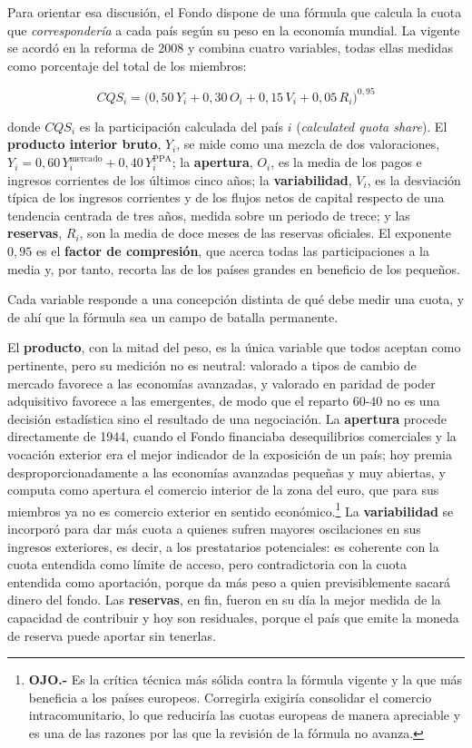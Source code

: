 \documentclass[10pt,a4paper]{article}
\begin{document}
Para orientar esa discusión, el Fondo dispone de una fórmula que calcula la cuota que \textit{correspondería} a cada país según su peso en la economía mundial. La vigente se acordó en la reforma de 2008 y combina cuatro variables, todas ellas medidas como porcentaje del total de los miembros:

$$CQS_i=\bigl(0{,}50\,Y_i+0{,}30\,O_i+0{,}15\,V_i+0{,}05\,R_i\bigr)^{0{,}95}$$

donde $CQS_i$ es la participación calculada del país $i$ (\textit{calculated quota share}). El \textbf{producto interior bruto}, $Y_i$, se mide como una mezcla de dos valoraciones, $Y_i=0{,}60\,Y_i^{\text{mercado}}+0{,}40\,Y_i^{\text{PPA}}$; la \textbf{apertura}, $O_i$, es la media de los pagos e ingresos corrientes de los últimos cinco años; la \textbf{variabilidad}, $V_i$, es la desviación típica de los ingresos corrientes y de los flujos netos de capital respecto de una tendencia centrada de tres años, medida sobre un periodo de trece; y las \textbf{reservas}, $R_i$, son la media de doce meses de las reservas oficiales. El exponente $0{,}95$ es el \textbf{factor de compresión}, que acerca todas las participaciones a la media y, por tanto, recorta las de los países grandes en beneficio de los pequeños.

Cada variable responde a una concepción distinta de qué debe medir una cuota, y de ahí que la fórmula sea un campo de batalla permanente.

El \textbf{producto}, con la mitad del peso, es la única variable que todos aceptan como pertinente, pero su medición no es neutral: valorado a tipos de cambio de mercado favorece a las economías avanzadas, y valorado en paridad de poder adquisitivo favorece a las emergentes, de modo que el reparto $60$-$40$ no es una decisión estadística sino el resultado de una negociación. La \textbf{apertura} procede directamente de 1944, cuando el Fondo financiaba desequilibrios comerciales y la vocación exterior era el mejor indicador de la exposición de un país; hoy premia desproporcionadamente a las economías avanzadas pequeñas y muy abiertas, y computa como apertura el comercio interior de la zona del euro, que para sus miembros ya no es comercio exterior en sentido económico.\footnote{%
    \textbf{OJO.-} Es la crítica técnica más sólida contra la fórmula vigente y la que más beneficia a los países europeos. Corregirla exigiría consolidar el comercio intracomunitario, lo que reduciría las cuotas europeas de manera apreciable y es una de las razones por las que la revisión de la fórmula no avanza.
} La \textbf{variabilidad} se incorporó para dar más cuota a quienes sufren mayores oscilaciones en sus ingresos exteriores, es decir, a los prestatarios potenciales: es coherente con la cuota entendida como límite de acceso, pero contradictoria con la cuota entendida como aportación, porque da más peso a quien previsiblemente sacará dinero del fondo. Las \textbf{reservas}, en fin, fueron en su día la mejor medida de la capacidad de contribuir y hoy son residuales, porque el país que emite la moneda de reserva puede aportar sin tenerlas.
\end{document}
